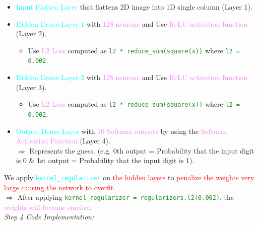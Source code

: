 \documentclass{book}
\begin{document}
\begin{itemize}
    \item \textcolor{cyan}{Input Flatten Layer} that flattens 2D image into 1D single column (Layer 1).
    \item \textcolor{cyan}{Hidden Dense Layer 1} with \textcolor{violet}{128 neurons} and Use \textcolor{violet}{ReLU activation function} (Layer 2).
    \begin{itemize}
        \item Use \textcolor{violet}{L2 Loss} computed as \textcolor{forestgreen}{\texttt{l2 * reduce\_sum(square(x))}} where \textcolor{forestgreen}{\texttt{l2 = 0.002}}.
    \end{itemize}
    \item \textcolor{cyan}{Hidden Dense Layer 2} with \textcolor{violet}{128 neurons} and Use \textcolor{violet}{ReLU activation function} (Layer 3).
    \begin{itemize}
        \item Use \textcolor{violet}{L2 Loss} computed as \textcolor{forestgreen}{\texttt{l2 * reduce\_sum(square(x))}} where \textcolor{forestgreen}{\texttt{l2 = 0.002}}.
    \end{itemize}
    \item \textcolor{cyan}{Output Dense Layer} with \textcolor{violet}{10 Softmax outputs} by using the \textcolor{violet}{Softmax Activation Function} (Layer 4).\\
    $\Rightarrow$ Represents the guess. (e.g. 0th output = Probability that the input digit is 0 \& 1st output = Probability that the input digit is 1).
\end{itemize}
We apply \textcolor{cyan}{\texttt{kernel\_regularizer}} on \textcolor{red}{the hidden layers} to \textcolor{red}{penalize the weights very large causing the network to overfit}.\\
$\Rightarrow$ After applying \textcolor{forestgreen}{\texttt{kernel\_regularizer = regularizers.l2(0.002)}}, the \textcolor{violet}{weights will become smaller}.\\
\vspace{3mm}
\textit{\large{Step 4 Code Implementation:}}
\end{document}
